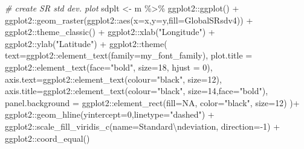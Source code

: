 \documentclass[
]{article}
\newenvironment{Shaded}{\begin{snugshade}}{\end{snugshade}}
\newcommand{\AttributeTok}[1]{\textcolor[rgb]{0.77,0.63,0.00}{#1}}
\newcommand{\CommentTok}[1]{\textcolor[rgb]{0.56,0.35,0.01}{\textit{#1}}}
\newcommand{\ConstantTok}[1]{\textcolor[rgb]{0.00,0.00,0.00}{#1}}
\newcommand{\DecValTok}[1]{\textcolor[rgb]{0.00,0.00,0.81}{#1}}
\newcommand{\FunctionTok}[1]{\textcolor[rgb]{0.00,0.00,0.00}{#1}}
\newcommand{\NormalTok}[1]{#1}
\newcommand{\OtherTok}[1]{\textcolor[rgb]{0.56,0.35,0.01}{#1}}
\newcommand{\SpecialCharTok}[1]{\textcolor[rgb]{0.00,0.00,0.00}{#1}}
\newcommand{\StringTok}[1]{\textcolor[rgb]{0.31,0.60,0.02}{#1}}
\begin{document}
\begin{Shaded}
\begin{Highlighting}[]
\CommentTok{\# create SR std dev. plot}
\NormalTok{sdplt }\OtherTok{\textless{}{-}}\NormalTok{ m }\SpecialCharTok{\%\textgreater{}\%}
\NormalTok{  ggplot2}\SpecialCharTok{::}\FunctionTok{ggplot}\NormalTok{() }\SpecialCharTok{+}
\NormalTok{  ggplot2}\SpecialCharTok{::}\FunctionTok{geom\_raster}\NormalTok{(ggplot2}\SpecialCharTok{::}\FunctionTok{aes}\NormalTok{(}\AttributeTok{x=}\NormalTok{x,}\AttributeTok{y=}\NormalTok{y,}\AttributeTok{fill=}\NormalTok{GlobalSRsdv4)) }\SpecialCharTok{+}
\NormalTok{  ggplot2}\SpecialCharTok{::}\FunctionTok{theme\_classic}\NormalTok{() }\SpecialCharTok{+}
\NormalTok{  ggplot2}\SpecialCharTok{::}\FunctionTok{xlab}\NormalTok{(}\StringTok{"Longitude"}\NormalTok{) }\SpecialCharTok{+}\NormalTok{ ggplot2}\SpecialCharTok{::}\FunctionTok{ylab}\NormalTok{(}\StringTok{"Latitude"}\NormalTok{) }\SpecialCharTok{+}
\NormalTok{  ggplot2}\SpecialCharTok{::}\FunctionTok{theme}\NormalTok{(}
    \AttributeTok{text=}\NormalTok{ggplot2}\SpecialCharTok{::}\FunctionTok{element\_text}\NormalTok{(}\AttributeTok{family=}\NormalTok{my\_font\_family),}
    \AttributeTok{plot.title =}\NormalTok{ ggplot2}\SpecialCharTok{::}\FunctionTok{element\_text}\NormalTok{(}\AttributeTok{face=}\StringTok{"bold"}\NormalTok{, }\AttributeTok{size=}\DecValTok{18}\NormalTok{, }\AttributeTok{hjust =} \DecValTok{0}\NormalTok{),}
    \AttributeTok{axis.text=}\NormalTok{ggplot2}\SpecialCharTok{::}\FunctionTok{element\_text}\NormalTok{(}\AttributeTok{colour=}\StringTok{"black"}\NormalTok{, }\AttributeTok{size=}\DecValTok{12}\NormalTok{),}
    \AttributeTok{axis.title=}\NormalTok{ggplot2}\SpecialCharTok{::}\FunctionTok{element\_text}\NormalTok{(}\AttributeTok{colour=}\StringTok{"black"}\NormalTok{, }\AttributeTok{size=}\DecValTok{14}\NormalTok{,}\AttributeTok{face=}\StringTok{"bold"}\NormalTok{),}
    \AttributeTok{panel.background =}\NormalTok{ ggplot2}\SpecialCharTok{::}\FunctionTok{element\_rect}\NormalTok{(}\AttributeTok{fill=}\ConstantTok{NA}\NormalTok{, }\AttributeTok{color=}\StringTok{"black"}\NormalTok{, }\AttributeTok{size=}\DecValTok{12}\NormalTok{)}
\NormalTok{  )}\SpecialCharTok{+}
\NormalTok{  ggplot2}\SpecialCharTok{::}\FunctionTok{geom\_hline}\NormalTok{(}\AttributeTok{yintercept=}\DecValTok{0}\NormalTok{,}\AttributeTok{linetype=}\StringTok{"dashed"}\NormalTok{) }\SpecialCharTok{+} 
\NormalTok{  ggplot2}\SpecialCharTok{::}\FunctionTok{scale\_fill\_viridis\_c}\NormalTok{(}\AttributeTok{name=}\StringTok{\textquotesingle{}Standard}\SpecialCharTok{\textbackslash{}n}\StringTok{deviation\textquotesingle{}}\NormalTok{, }\AttributeTok{direction=}\SpecialCharTok{{-}}\DecValTok{1}\NormalTok{) }\SpecialCharTok{+}
\NormalTok{  ggplot2}\SpecialCharTok{::}\FunctionTok{coord\_equal}\NormalTok{()}


\end{Highlighting}
\end{Shaded}
\end{document}
